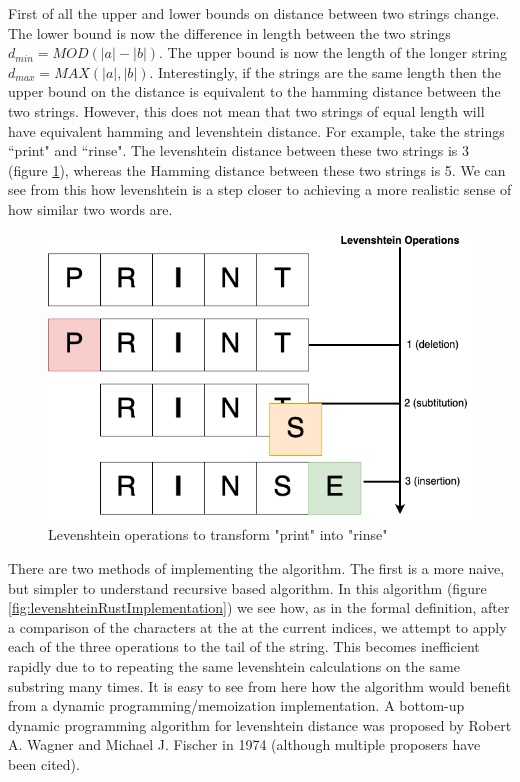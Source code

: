 \documentclass[a4paper,11pt]{article}
\begin{document}
First of all the upper and lower bounds on distance between two strings change. The lower bound is now the difference in length between the two strings $d_{min} = MOD(|a| - |b|)$. The upper bound is now the length of the longer string $d_{max} = MAX(|a|, |b|)$. Interestingly, if the strings are the same length then the upper bound on the distance is equivalent to the hamming distance between the two strings. However, this does not mean that two strings of equal length will have equivalent hamming and levenshtein distance. For example, take the strings ``print" and ``rinse". The levenshtein distance between these two strings is 3 (figure \ref{fig:levenshteinDemo}), whereas the Hamming distance between these two strings is 5. We can see from this how levenshtein is a step closer to achieving a more realistic sense of how similar two words are.

\begin{figure}[H]
    \centering
    \includegraphics[width=0.4\linewidth]{diagrams/levenshteinDemo.png}
    \caption{Levenshtein operations to transform "print" into "rinse"}
    \label{fig:levenshteinDemo}
\end{figure}

There are two methods of implementing the algorithm. The first is a more naive, but simpler to understand recursive based algorithm. In this algorithm (figure \ref{fig:levenshteinRustImplementation}) we see how, as in the formal definition, after a comparison of the characters at the at the current indices, we attempt to apply each of the three operations to the tail of the string. This becomes inefficient rapidly due to to repeating the same levenshtein calculations on the same substring many times. It is easy to see from here how the algorithm would benefit from a dynamic programming/memoization implementation. A bottom-up dynamic programming algorithm for levenshtein distance was proposed by Robert A. Wagner and Michael J. Fischer in 1974 \citep{wagnerFischer} (although multiple proposers have been cited).
\end{document}
